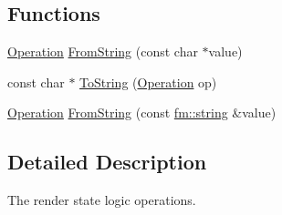 \subsection*{Functions}
\begin{DoxyCompactItemize}
\item 
\hyperlink{namespaceFUDaePassStateLogicOperation_aabe5119ffa94a96a4936012f067b7ff4}{Operation} \hyperlink{namespaceFUDaePassStateLogicOperation_ac8f2106e1ee7e6e799cae5f18985a2a0}{FromString} (const char $\ast$value)
\item 
const char $\ast$ \hyperlink{namespaceFUDaePassStateLogicOperation_a4e918bedc26709acf27daf0925696411}{ToString} (\hyperlink{namespaceFUDaePassStateLogicOperation_aabe5119ffa94a96a4936012f067b7ff4}{Operation} op)
\item 
\hyperlink{namespaceFUDaePassStateLogicOperation_aabe5119ffa94a96a4936012f067b7ff4}{Operation} \hyperlink{namespaceFUDaePassStateLogicOperation_a717ce8f18786a35406920d05c6815fca}{FromString} (const \hyperlink{classfm_1_1stringT}{fm::string} \&value)
\end{DoxyCompactItemize}


\subsection{Detailed Description}
The render state logic operations. 

